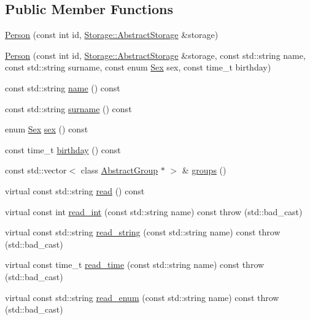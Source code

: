 \subsection*{Public Member Functions}
\begin{DoxyCompactItemize}
\item 
\hyperlink{classCore_1_1Person_a3f7bca52408bae72dd0213b2a92827f0}{Person} (const int id, \hyperlink{classStorage_1_1AbstractStorage}{Storage::AbstractStorage} \&storage)
\item 
\hyperlink{classCore_1_1Person_aa1b55740d1dd9f2543ad27f4ecca8e72}{Person} (const int id, \hyperlink{classStorage_1_1AbstractStorage}{Storage::AbstractStorage} \&storage, const std::string name, const std::string surname, const enum \hyperlink{classCore_1_1Person_a01e6eee93727f9ce06525eca689b4764}{Sex} sex, const time\_\-t birthday)
\item 
const std::string \hyperlink{classCore_1_1Person_a14d39111fb34383818154a26b0d248f5}{name} () const 
\item 
const std::string \hyperlink{classCore_1_1Person_a5572207d53649af10cd9bb62fe21995c}{surname} () const 
\item 
enum \hyperlink{classCore_1_1Person_a01e6eee93727f9ce06525eca689b4764}{Sex} \hyperlink{classCore_1_1Person_a0d70ad24edf86e3c0f88e913342aa24d}{sex} () const 
\item 
const time\_\-t \hyperlink{classCore_1_1Person_ab0d1836a97254798585fc6c97a63680e}{birthday} () const 
\item 
const std::vector$<$ class \hyperlink{classCore_1_1AbstractGroup}{AbstractGroup} $\ast$ $>$ \& \hyperlink{classCore_1_1Person_ae6dc9f0c0ca2caf326b69b72d81aea84}{groups} ()
\item 
virtual const std::string \hyperlink{classCore_1_1Person_a3b86cab797444527364376dad2a0c300}{read} () const 
\item 
virtual const int \hyperlink{classCore_1_1Person_a9b1601502537f54b7c33fc593f8df590}{read\_\-int} (const std::string name) const   throw (std::bad\_\-cast)
\item 
virtual const std::string \hyperlink{classCore_1_1Person_a4b7d0b1c545c2c4876b3f410b914f3a2}{read\_\-string} (const std::string name) const   throw (std::bad\_\-cast)
\item 
virtual const time\_\-t \hyperlink{classCore_1_1Person_ad0485ff28f4f80aeb0da9f8a6ae2f6d0}{read\_\-time} (const std::string name) const   throw (std::bad\_\-cast)
\item 
virtual const std::string \hyperlink{classCore_1_1Person_a5dfa21d7b0a58e09f71e07a4298f0f62}{read\_\-enum} (const std::string name) const   throw (std::bad\_\-cast)

\end{DoxyCompactItemize}
